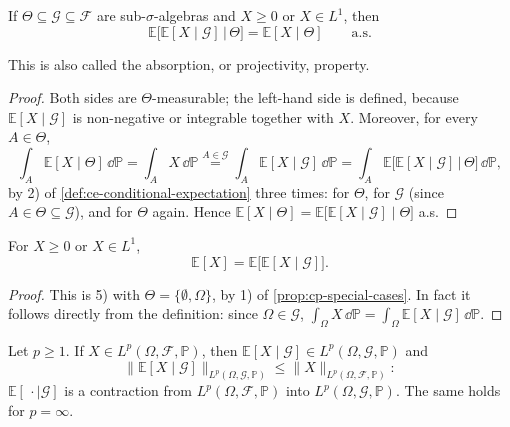 \begin{proposition}\label{prop:cp-tower}
If $\Theta\subseteq\mathcal G\subseteq\mathcal F$ are sub-$\sigma$-algebras and $X\ge0$ or
$X\in L^1$, then
\[
  \mathbb E\big[\mathbb E[X\mid\mathcal G]\,\big|\,\Theta\big]=\mathbb E[X\mid\Theta]\qquad\text{a.s.}
\]
\end{proposition}

This is also called the absorption, or projectivity, property.

\begin{proof}
Both sides are $\Theta$-measurable; the left-hand side is defined, because
$\mathbb E[X\mid\mathcal G]$ is non-negative or integrable together with $X$. Moreover, for
every $A\in\Theta$,
\[
  \int_A\mathbb E[X\mid\Theta]\,\dd\mathbb P=\int_AX\,\dd\mathbb P
  \overset{A\in\mathcal G}{=}\int_A\mathbb E[X\mid\mathcal G]\,\dd\mathbb P
  =\int_A\mathbb E\big[\mathbb E[X\mid\mathcal G]\,\big|\,\Theta\big]\,\dd\mathbb P,
\]
by 2) of \cref{def:ce-conditional-expectation} three times: for $\Theta$, for $\mathcal G$ (since
$A\in\Theta\subseteq\mathcal G$), and for $\Theta$ again. Hence
$\mathbb E[X\mid\Theta]=\mathbb E\big[\mathbb E[X\mid\mathcal G]\mid\Theta\big]$ a.s.
\end{proof}

\begin{proposition}\label{prop:cp-expectation}
For $X\ge0$ or $X\in L^1$,
\[
  \mathbb E[X]=\mathbb E\big[\mathbb E[X\mid\mathcal G]\big].
\]
\end{proposition}

\begin{proof}
This is 5) with $\Theta=\{\emptyset,\Omega\}$, by 1) of \cref{prop:cp-special-cases}. In fact it
follows directly from the definition: since $\Omega\in\mathcal G$,
$\int_\Omega X\,\dd\mathbb P=\int_\Omega\mathbb E[X\mid\mathcal G]\,\dd\mathbb P$.
\end{proof}

\begin{proposition}\label{prop:cp-contraction}
Let $p\ge1$. If $X\in L^p(\Omega,\mathcal F,\mathbb P)$, then
$\mathbb E[X\mid\mathcal G]\in L^p(\Omega,\mathcal G,\mathbb P)$ and
\[
  \big\|\mathbb E[X\mid\mathcal G]\big\|_{L^p(\Omega,\mathcal G,\mathbb P)}\le\|X\|_{L^p(\Omega,\mathcal F,\mathbb P)} :
\]
$\mathbb E[\,\cdot\mid\mathcal G]$ is a contraction from $L^p(\Omega,\mathcal F,\mathbb P)$ into
$L^p(\Omega,\mathcal G,\mathbb P)$. The same holds for $p=\infty$.
\end{proposition}

